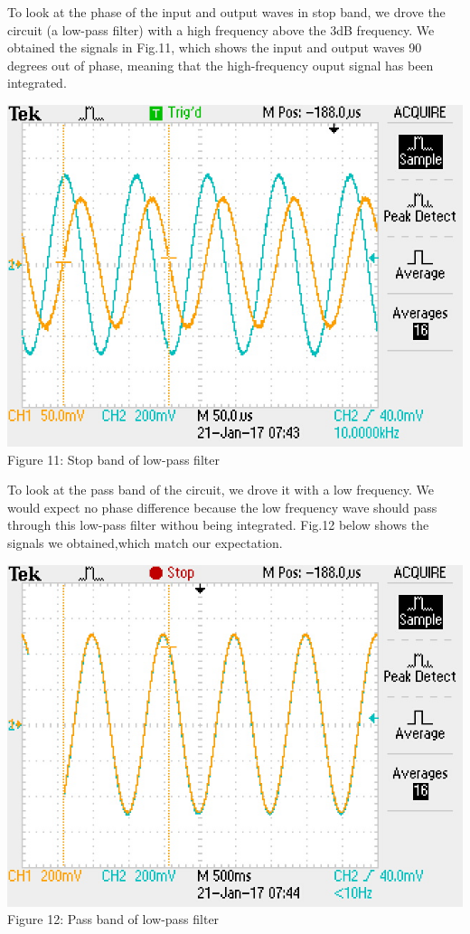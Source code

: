\documentclass[]{article}
\begin{document}
	To look at the phase of the input and output waves in stop band, we drove the circuit (a low-pass filter) with a high frequency above the 3dB frequency. We obtained the signals in Fig.11, which shows the input and output waves 90 degrees out of phase, meaning that the high-frequency ouput signal has been integrated.
		\begin{center}
			\includegraphics[scale=0.7]{e_stopband}\\
			Figure 11: Stop band of low-pass filter
		\end{center}
	To look at the pass band of the circuit, we drove it with a  low frequency. We would expect no phase difference because the low frequency wave should pass through this low-pass filter withou being integrated. Fig.12 below shows the signals we obtained,which match our expectation.
		\begin{center}
			\includegraphics[scale=0.7]{e_passband}\\
			Figure 12: Pass band of low-pass filter
		\end{center}
\end{document}
